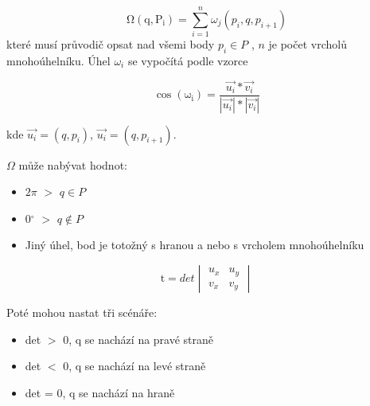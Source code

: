 \documentclass[oneside,12pt,a4paper]{book}
\begin{document}
\begin{equation}
    \mathrm{\Omega(q, P_i)} = \sum_{i=1}^{n} {\omega_j(p_i,q,p_{i+1})}
\tag{2}
\label{rotace}
\end{equation}
které musí průvodič opsat nad všemi body $p_i\in P$ , $n$ je počet vrcholů mnohoúhelníku.
Úhel $\omega_i$ se vypočítá podle vzorce

\begin{equation}
    \mathrm{\cos(\omega_i)} = \frac{{\vec{u_i}*\vec{v_i}}}{{\left| \vec{u_i} \right |}*{\left| \vec{v_i} \right |}}
\tag{3}
\label{omega}
\end{equation}

kde $\vec{u_i} = (q,p_i)$,  $\vec{u_i} = (q,p_{i+1})$.

$\Omega$ může nabývat hodnot:
\begin{itemize}
\item $2\pi$ $>$ $q\in P$
\item 0$^{\circ}$ $>$ $q\notin P$   %

\item Jiný úhel, bod je totožný s hranou a nebo s vrcholem mnohoúhelníku
\end{itemize}

\begin{equation}
    \mathrm{t} = det
    \begin{vmatrix}
u_x & u_y\\
v_x & v_y
\end{vmatrix}
\tag{4}
\label{omega}
\end{equation}

Poté mohou nastat tři scénáře:
\begin{itemize}
\item det $>$ 0, q se nachází na pravé straně
\item det $<$ 0, q se nachází na levé straně
\item det = 0, q se nachází na hraně
\end{itemize}
\bigskip
\bigskip
\end{document}
